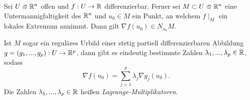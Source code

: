 \documentclass{cheat-sheet}
\begin{document}
\begin{satz}
Sei $U \opn \R^n$ offen und $f : U \to \mathbb{R}$ differenzierbar. Ferner sei $M \subset U \opn \R^n$ eine Untermannigfaltigkeit des $\mathbb{R}^n$ und $u_0 \in M$ ein Punkt, an welchem $f\mid_M$ ein lokales Extremum annimmt. Dann gilt $\nabla f(u_0) \in N_{u_0} M$.

Ist $M$ sogar ein reguläres Urbild einer stetig partiell differenzierbaren Abbildung $ g = (g_1, ..., g_p) : U \to \mathbb{R}^p$, dann gibt es eindeutig bestimmte Zahlen $\lambda_1, ..., \lambda_p \in \mathbb{R}$, sodass
\[ \nabla f(u_0) = \sum_{j = 1}^{p} \lambda_j \nabla g_j(u_0). \]
Die Zahlen $\lambda_1, ..., \lambda_p \in \mathbb{R}$ heißen \emph{Lagrange-Multiplikatoren}.
\end{satz}
\end{document}
